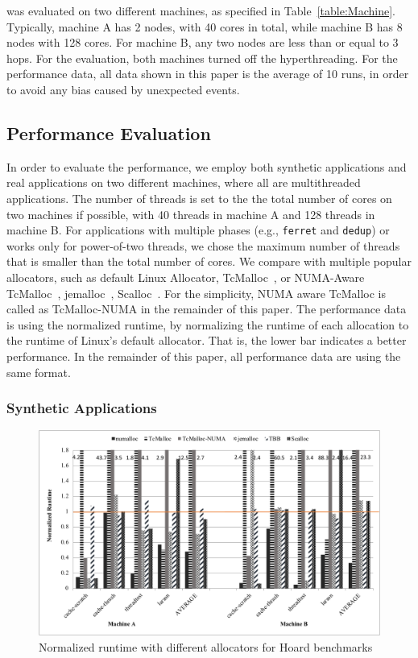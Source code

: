 \NM{} was evaluated on two different machines, as specified in Table~\ref{table:Machine}. Typically, machine A has 2 nodes, with 40 cores in total, while machine B has 8 nodes with 128 cores. For machine B, any two nodes are less than or equal to 3 hops. For the evaluation, both machines turned off the hyperthreading. For the performance data, all data shown in this paper is the average of 10 runs, in order to avoid any bias caused by unexpected events.  

\subsection{Performance Evaluation}

\label{sec:performance}

In order to evaluate the performance, we employ both synthetic applications and real applications on two different machines, where all are multithreaded applications. The number of threads is set to the the total number of cores on two machines if possible, with 40 threads in machine A and 128 threads in machine B. For applications with multiple phases (e.g., \texttt{ferret} and \texttt{dedup}) or works only for power-of-two threads, we chose the maximum number of threads that is smaller than the total number of cores.  We compare \NM{} with multiple popular allocators, such as default Linux Allocator, TcMalloc~\cite{tcmalloc}, or NUMA-Aware TcMalloc~\cite{tcmallocnew}, jemalloc~\cite{jemalloc}, Scalloc~\cite{Scalloc}. For the simplicity, NUMA aware TcMalloc is called as TcMalloc-NUMA in the remainder of this paper. The performance data is using the normalized runtime, by normalizing the runtime of each allocation to the runtime of Linux's default   allocator. That is, the lower bar indicates a better performance. In the remainder of this paper, all performance data are using the same format. 

\subsubsection{Synthetic Applications}
\label{sec:synthetic}

\begin{figure}[!ht]
    \centering
    \includegraphics[width=\textwidth]{figure/hoard-perf.pdf}
    \caption{Normalized runtime with different allocators for Hoard benchmarks}
    \label{hoard-perf}
\end{figure}

